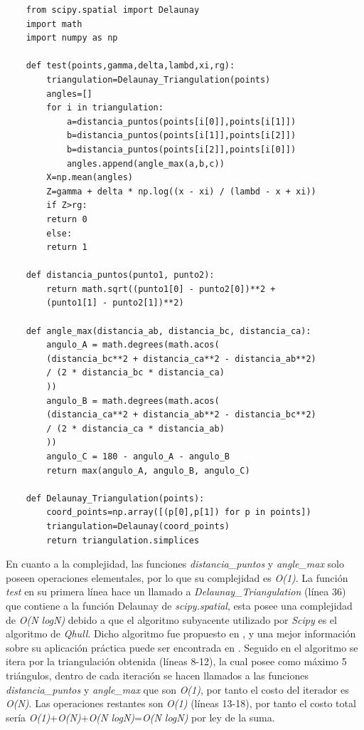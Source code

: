 \documentclass[12pt]{report}
\begin{document}
\begin{lstlisting}
	from scipy.spatial import Delaunay
	import math
	import numpy as np
	
	def test(points,gamma,delta,lambd,xi,rg):
		triangulation=Delaunay_Triangulation(points)
		angles=[]
		for i in triangulation:
			a=distancia_puntos(points[i[0]],points[i[1]])
			b=distancia_puntos(points[i[1]],points[i[2]])
			b=distancia_puntos(points[i[2]],points[i[0]])
			angles.append(angle_max(a,b,c))
		X=np.mean(angles)
		Z=gamma + delta * np.log((x - xi) / (lambd - x + xi))
		if Z>rg:
		return 0
		else:
		return 1
	
	def distancia_puntos(punto1, punto2):
		return math.sqrt((punto1[0] - punto2[0])**2 +
		(punto1[1] - punto2[1])**2)
	
	def angle_max(distancia_ab, distancia_bc, distancia_ca):
		angulo_A = math.degrees(math.acos(
		(distancia_bc**2 + distancia_ca**2 - distancia_ab**2) 
		/ (2 * distancia_bc * distancia_ca)
		))
		angulo_B = math.degrees(math.acos(
		(distancia_ca**2 + distancia_ab**2 - distancia_bc**2) 
		/ (2 * distancia_ca * distancia_ab)
		))
		angulo_C = 180 - angulo_A - angulo_B  
		return max(angulo_A, angulo_B, angulo_C)
		
	def Delaunay_Triangulation(points):
		coord_points=np.array([(p[0],p[1]) for p in points])
		triangulation=Delaunay(coord_points)
		return triangulation.simplices
\end{lstlisting}

En cuanto a la complejidad, las funciones \textit{distancia\_puntos} y \textit{angle\_max} solo poseen operaciones elementales, por lo que su complejidad es \textit{O(1)}. La función\textit{ test} en su primera línea hace un llamado a  \textit{Delaunay\_Triangulation} (línea 36) que  contiene a la función Delaunay de \textit{scipy.spatial}, esta posee una complejidad de \textit{O(N logN)} debido a que el algoritmo subyacente utilizado por \textit{Scipy} es el algoritmo de \textit{Qhull}. Dicho algoritmo fue propuesto en \cite{31}, y una mejor información sobre su aplicación práctica puede ser encontrada en \cite{32}. Seguido en el algoritmo se itera por la triangulación obtenida (líneas 8-12), la cual posee como máximo 5 triángulos, dentro de cada iteración se hacen llamados a las  funciones \textit{distancia\_puntos} y \textit{angle\_max}  que son \textit{O(1)}, por tanto el costo del iterador es \textit{O(N)}. Las operaciones restantes son \textit{O(1)} (líneas 13-18), por tanto el costo total sería \textit{O(1)}+\textit{O(N)}+\textit{O(N logN)}=\textit{O(N logN)} por ley de la suma.
\end{document}
